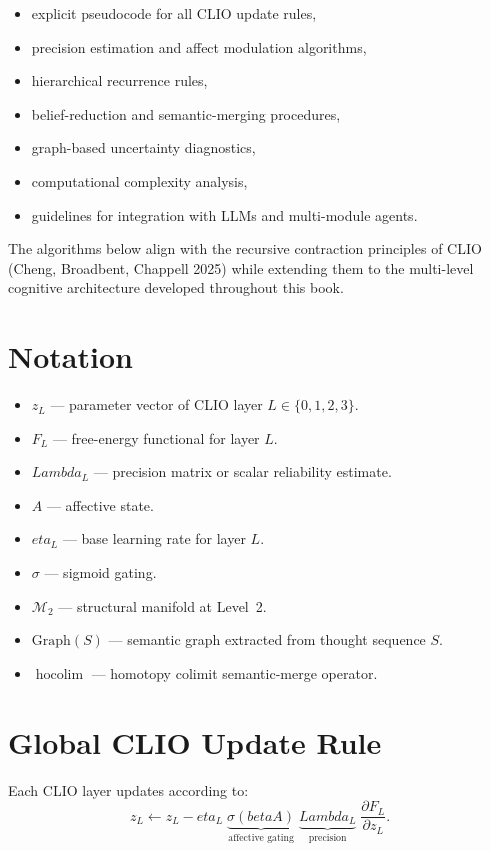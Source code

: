 \documentclass[12pt,oneside]{book}
\theoremstyle{plain}
\theoremstyle{definition}
\def\beta{beta}%
\def\eta{eta}%
\def\Lambda{Lambda}%
\begin{document}
\begin{itemize}
  \item explicit pseudocode for all CLIO update rules,
  \item precision estimation and affect modulation algorithms,
  \item hierarchical recurrence rules,
  \item belief-reduction and semantic-merging procedures,
  \item graph-based uncertainty diagnostics,
  \item computational complexity analysis,
  \item guidelines for integration with LLMs and multi-module agents.
\end{itemize}

The algorithms below align with the recursive contraction principles of
CLIO (Cheng, Broadbent, Chappell 2025) while extending them to the
multi-level cognitive architecture developed throughout this book.

\section{Notation}

\begin{itemize}
  \item $z_L$ — parameter vector of CLIO layer $L \in \{0,1,2,3\}$.
  \item $F_L$ — free-energy functional for layer $L$.
  \item $\Lambda_L$ — precision matrix or scalar reliability estimate.
  \item $A$ — affective state.
  \item $\eta_L$ — base learning rate for layer $L$.
  \item $\sigma$ — sigmoid gating.
  \item $\mathcal{M}_2$ — structural manifold at Level~2.
  \item $\mathrm{Graph}(S)$ — semantic graph extracted from thought sequence $S$.
  \item $\operatorname{hocolim}$ — homotopy colimit semantic-merge operator.
\end{itemize}

\section{Global CLIO Update Rule}

Each CLIO layer updates according to:
\[
z_L \leftarrow z_L
 - \eta_L \;
   \underbrace{\sigma(\beta A)}_{\text{affective gating}}\;
   \underbrace{\Lambda_L}_{\text{precision}}\;
   \frac{\partial F_L}{\partial z_L}.
\]
\end{document}
